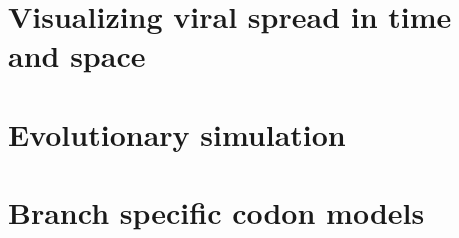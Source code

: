 \documentclass[12pt,twoside]{mitthesis}
\theoremstyle{plain}
\theoremstyle{definition}
\theoremstyle{remark}
\begin{document}
\chapter{Visualizing viral spread in time and space}


\chapter{Evolutionary simulation}


\chapter{Branch specific codon models}



\end{document}
